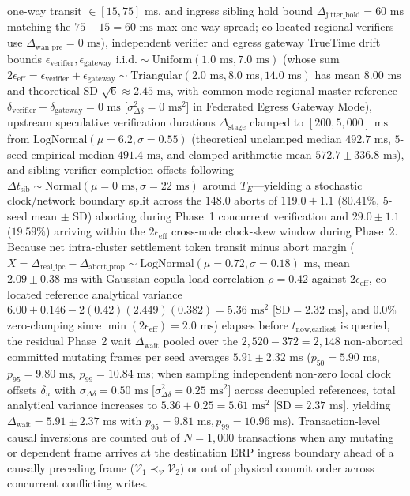\documentclass[conference,10pt]{IEEEtran}
\begin{document}
one-way transit $\in [15, 75]\text{ ms}$, and ingress sibling hold bound $\Delta_{\text{jitter\_hold}} = 60\text{ ms}$ matching the $75 - 15 = 60\text{ ms}$ max one-way spread; co-located regional verifiers use $\Delta_{\text{wan\_pre}} = 0\text{ ms}$), independent verifier and egress gateway TrueTime drift bounds $\epsilon_{\text{verifier}}, \epsilon_{\text{gateway}} \text{ i.i.d.}\sim \text{Uniform}(1.0\text{ ms}, 7.0\text{ ms})$ (whose sum $2\epsilon_{\text{eff}} = \epsilon_{\text{verifier}} + \epsilon_{\text{gateway}} \sim \text{Triangular}(2.0\text{ ms}, 8.0\text{ ms}, 14.0\text{ ms})$ has mean $8.00\text{ ms}$ and theoretical SD $\sqrt{6} \approx 2.45\text{ ms}$, with common-mode regional master reference $\delta_{\text{verifier}} - \delta_{\text{gateway}} = 0\text{ ms}$ [$\sigma_{\Delta\delta}^2 = 0\text{ ms}^2$] in Federated Egress Gateway Mode), upstream speculative verification durations $\Delta_{\text{stage}}$ clamped to $[200, 5{,}000]\text{ ms}$ from $\text{LogNormal}(\mu = 6.2, \sigma = 0.55)$ (theoretical unclamped median $492.7\text{ ms}$, $5$-seed empirical median $491.4\text{ ms}$, and clamped arithmetic mean $572.7 \pm 336.8\text{ ms}$), and sibling verifier completion offsets following $\Delta t_{\text{sib}} \sim \text{Normal}(\mu = 0\text{ ms}, \sigma = 22\text{ ms})$ around $T_E$---yielding a stochastic clock/network boundary split across the $148.0$ aborts of $119.0 \pm 1.1$ ($80.41\%$, $5$-seed mean $\pm$ SD) aborting during Phase~1 concurrent verification and $29.0 \pm 1.1$ ($19.59\%$) arriving within the $2\epsilon_{\text{eff}}$ cross-node clock-skew window during Phase~2. Because net intra-cluster settlement token transit minus abort margin ($X = \Delta_{\text{real\_ipc}} - \Delta_{\text{abort\_prop}} \sim \text{LogNormal}(\mu = 0.72, \sigma = 0.18)\text{ ms}$, mean $2.09 \pm 0.38\text{ ms}$ with Gaussian-copula load correlation $\rho = 0.42$ against $2\epsilon_{\text{eff}}$, co-located reference analytical variance $6.00 + 0.146 - 2(0.42)(2.449)(0.382) = 5.36\text{ ms}^2$ [$\text{SD} = 2.32\text{ ms}$], and $0.0\%$ zero-clamping since $\min(2\epsilon_{\text{eff}}) = 2.0\text{ ms}$) elapses before $t_{\text{now},\text{earliest}}$ is queried, the residual Phase~2 wait $\Delta_{\text{wait}}$ pooled over the $2{,}520 - 372 = 2{,}148$ non-aborted committed mutating frames per seed averages $5.91 \pm 2.32\text{ ms}$ ($p_{50} = 5.90\text{ ms}$, $p_{95} = 9.80\text{ ms}$, $p_{99} = 10.84\text{ ms}$; when sampling independent non-zero local clock offsets $\delta_u$ with $\sigma_{\Delta\delta} = 0.50\text{ ms}$ [$\sigma_{\Delta\delta}^2 = 0.25\text{ ms}^2$] across decoupled references, total analytical variance increases to $5.36 + 0.25 = 5.61\text{ ms}^2$ [$\text{SD} = 2.37\text{ ms}$], yielding $\Delta_{\text{wait}} = 5.91 \pm 2.37\text{ ms}$ with $p_{95} = 9.81\text{ ms}, p_{99} = 10.96\text{ ms}$). Transaction-level causal inversions are counted out of $N = 1{,}000$ transactions when any mutating or dependent frame arrives at the destination ERP ingress boundary ahead of a causally preceding frame ($\mathcal{V}_1 \prec_{\mathcal{V}} \mathcal{V}_2$) or out of physical commit order across concurrent conflicting writes.
\end{document}
